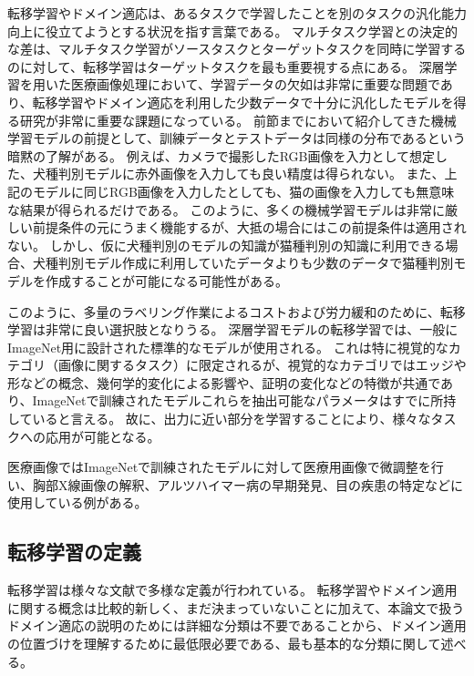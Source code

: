 

転移学習やドメイン適応は、あるタスクで学習したことを別のタスクの汎化能力向上に役立てようとする状況を指す言葉である。
マルチタスク学習との決定的な差は、マルチタスク学習がソースタスクとターゲットタスクを同時に学習するのに対して、転移学習はターゲットタスクを最も重要視する点にある。
深層学習を用いた医療画像処理において、学習データの欠如は非常に重要な問題であり、転移学習やドメイン適応を利用した少数データで十分に汎化したモデルを得る研究が非常に重要な課題になっている。    
前節までにおいて紹介してきた機械学習モデルの前提として、訓練データとテストデータは同様の分布であるという暗黙の了解がある。
例えば、カメラで撮影したRGB画像を入力として想定した、犬種判別モデルに赤外画像を入力しても良い精度は得られない。
また、上記のモデルに同じRGB画像を入力したとしても、猫の画像を入力しても無意味な結果が得られるだけである。
このように、多くの機械学習モデルは非常に厳しい前提条件の元にうまく機能するが、大抵の場合にはこの前提条件は適用されない。
しかし、仮に犬種判別のモデルの知識が猫種判別の知識に利用できる場合、犬種判別モデル作成に利用していたデータよりも少数のデータで猫種判別モデルを作成することが可能になる可能性がある。

このように、多量のラベリング作業によるコストおよび労力緩和のために、転移学習は非常に良い選択肢となりうる。
深層学習モデルの転移学習では、一般にImageNet用に設計された標準的なモデルが使用される。
これは特に視覚的なカテゴリ（画像に関するタスク）に限定されるが、視覚的なカテゴリではエッジや形などの概念、幾何学的変化による影響や、証明の変化などの特徴が共通であり、ImageNetで訓練されたモデルこれらを抽出可能なパラメータはすでに所持していると言える。
故に、出力に近い部分を学習することにより、様々なタスクへの応用が可能となる。

医療画像ではImageNetで訓練されたモデルに対して医療用画像で微調整を行い、胸部X線画像の解釈\cite{majkowska2020chest}、アルツハイマー病の早期発見\cite{ding2019deep}、目の疾患の特定\cite{varadarajan2018deep}などに使用している例がある。

\subsection{転移学習の定義}
    転移学習は様々な文献で多様な定義が行われている\cite{pan2009survey, zhu2011heterogeneous, shao2014transfer, zhang2017transfer}。
    転移学習やドメイン適用に関する概念は比較的新しく、まだ決まっていないことに加えて、本論文で扱うドメイン適応の説明のためには詳細な分類は不要であることから、ドメイン適用の位置づけを理解するために最低限必要である、最も基本的な分類\cite{pan2009survey}に関して述べる。
    
